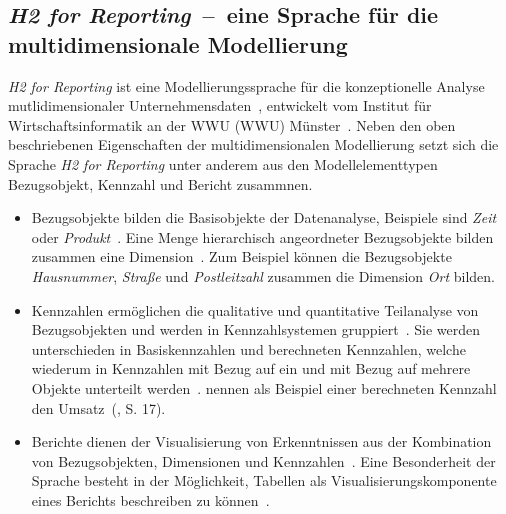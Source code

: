 \documentclass[
  language=german, %
  type=bachelor,%
  ngerman
]{isthesis}
\begin{document}
\begin{content}
  \subsection{\textit{H2 for Reporting}~--~eine Sprache für die multidimensionale Modellierung}

  \textit{H2 for Reporting} ist eine Modellierungssprache für die
  konzeptionelle Analyse mutlidimensionaler Unternehmensdaten~\cite[][S. 5, S.
  23]{becker2007h2}, entwickelt vom Institut für Wirtschaftsinformatik an der
  \acrlong{WWU} (\acrshort{WWU}) Münster~\cite[][S. 59 -
  78]{janiesch2007contextual}. Neben den oben beschriebenen Eigenschaften der
  multidimensionalen Modellierung setzt sich die Sprache \textit{H2 for
  Reporting} unter anderem aus den Modellelementtypen Bezugsobjekt, Kennzahl
  und Bericht zusammnen. 

	\begin{itemize}

		\item Bezugsobjekte bilden die Basisobjekte der Datenanalyse, Beispiele
		sind \textit{Zeit} oder \textit{Produkt}~\cite[][S.  5]{becker2007h2}. Eine
		Menge hierarchisch angeordneter Bezugsobjekte bilden zusammen eine
		Dimension~\cite[][S.  88]{becker2012fachkonzeptionelle}. Zum Beispiel
		können die Bezugsobjekte \textit{Hausnummer}, \textit{Straße} und
		\textit{Postleitzahl} zusammen die Dimension \textit{Ort} bilden.

		\item Kennzahlen ermöglichen die qualitative und quantitative Teilanalyse
		von Bezugsobjekten und werden in Kennzahlsystemen
		gruppiert~\cite[][S.88]{becker2012fachkonzeptionelle}. Sie werden
		unterschieden in Basiskennzahlen und berechneten Kennzahlen, welche
		wiederum in Kennzahlen mit Bezug auf ein und mit Bezug auf mehrere Objekte
		unterteilt werden~\cite[][S.  15]{becker2007h2}.
		\textsc{\citeauthor{becker2007h2}} nennen als Beispiel einer berechneten
		Kennzahl den Umsatz~(\cite{becker2007h2}, S. 17).

    \item Berichte dienen der Visualisierung von Erkenntnissen aus der
      Kombination von Bezugsobjekten, Dimensionen und Kennzahlen~\cite[][S.
      23]{becker2007h2}. Eine Besonderheit der Sprache besteht in der
      Möglichkeit, Tabellen als Visualisierungskomponente eines Berichts
      beschreiben zu können~\cite[][S. 86]{becker2012fachkonzeptionelle}.

	\end{itemize}


\end{content}
\end{document}
